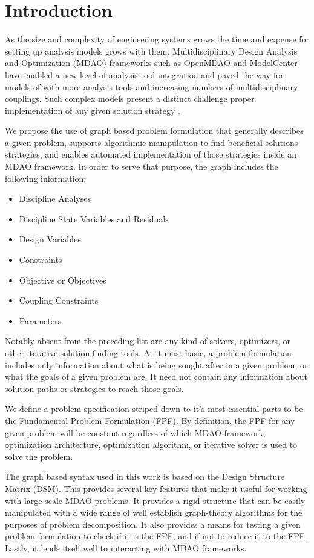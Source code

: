 \section{Introduction}
    
    As the size and complexity of engineering systems grows the time and expense for setting up 
    analysis models grows with them. Multidisciplinary Design Analysis and Optimization (MDAO)
    frameworks such as OpenMDAO\cite{Gray2012} and ModelCenter have enabled a new level of analysis tool integration 
    and paved the way for models of with more analysis tools and increasing numbers of multidisciplinary couplings. 
    Such complex models present a distinct challenge proper implementation of any given solution strategy . 
    
    We propose the use of graph based problem formulation that generally describes a
    given problem, supports algorithmic manipulation to find beneficial solutions strategies, and enables automated 
    implementation of those strategies inside an MDAO framework. In order to serve that purpose, the graph includes the following information: 
    \begin{itemize}
       \item Discipline Analyses 
       \item Discipline State Variables and Residuals
       \item Design Variables
       \item Constraints
       \item Objective or Objectives
       \item Coupling Constraints
       \item Parameters
    \end{itemize}
    Notably absent from the preceding list are any kind of solvers, optimizers, or other iterative solution finding tools. 
    At it most basic, a problem formulation includes only information about what is being sought after in a given problem, or what the
    goals of a given problem are. It need not contain any information about solution paths or strategies to reach those goals. 

    We define a problem specification striped down to it's most essential parts to be the 
    Fundamental Problem Formulation (FPF). By definition, the FPF for any given problem will be constant regardless 
    of which MDAO framework, optimization architecture, optimization algorithm, or iterative solver is used to solve the problem.

    The graph based syntax used in this work is based on the Design Structure Matrix (DSM). 
    This provides several key features that make it useful for working with large scale MDAO problems. 
    It provides a rigid structure that can be easily manipulated with a wide range of well establish graph-theory algorithms 
    for the purposes of problem decomposition. It also provides a means for testing a given 
    problem formulation to check if it is the FPF, and if not to reduce it to the FPF. Lastly, it lends itself 
    well to interacting with MDAO frameworks. 

